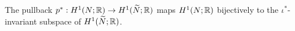 \begin{lem}
  \label{lem:injective}
  The pullback $p^{\ast}:H^1(N;\mathbb{R})\rightarrow H^1(\widetilde{N};\mathbb{R})$ maps $H^1(N; \mathbb{R})$ bijectively to the $\iota^{\ast}$-invariant subspace of   $H^1(\widetilde{N}; \mathbb{R})$.
\end{lem}
%
    




